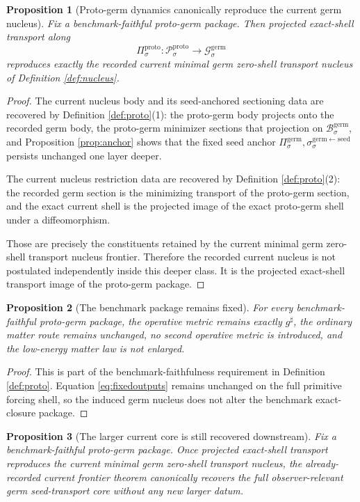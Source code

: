 \documentclass[11pt]{article}
\newcommand{\CompletedMetric}{g^{\sharp}}
\newcommand{\GermState}[1]{\mathcal G_{#1}^{\mathrm{germ}}}
\newcommand{\GermBody}[1]{\mathcal B_{#1}^{\mathrm{germ}}}
\newcommand{\GermProj}[1]{\Pi_{#1}^{\mathrm{germ}}}
\newcommand{\GermSeedSec}[1]{\sigma_{#1}^{\mathrm{germ\leftarrow seed}}}
\newcommand{\ProtoState}[1]{\mathcal P_{#1}^{\mathrm{proto}}}
\newcommand{\ProtoProj}[1]{\Pi_{#1}^{\mathrm{proto}}}
\newtheorem{proposition}{Proposition}
\begin{document}
\begin{proposition}[Proto-germ dynamics canonically reproduce the current germ nucleus]
\label{prop:nucleus}
Fix a benchmark-faithful proto-germ package. Then projected exact-shell transport along
\[
\ProtoProj{\sigma}:\ProtoState{\sigma}\to\GermState{\sigma}
\]
reproduces exactly the recorded current minimal germ zero-shell transport nucleus of Definition \ref{def:nucleus}.
\end{proposition}

\begin{proof}
The current nucleus body and its seed-anchored sectioning data are recovered by Definition \ref{def:proto}(1): the proto-germ body projects onto the recorded germ body, the proto-germ minimizer sections that projection on \(\GermBody{\sigma}\), and Proposition \ref{prop:anchor} shows that the fixed seed anchor \(\GermProj{\sigma},\GermSeedSec{\sigma}\) persists unchanged one layer deeper.

The current nucleus restriction data are recovered by Definition \ref{def:proto}(2): the recorded germ section is the minimizing transport of the proto-germ section, and the exact current shell is the projected image of the exact proto-germ shell under a diffeomorphism.

Those are precisely the constituents retained by the current minimal germ zero-shell transport nucleus frontier. Therefore the recorded current nucleus is not postulated independently inside this deeper class. It is the projected exact-shell transport image of the proto-germ package.
\end{proof}

\begin{proposition}[The benchmark package remains fixed]
\label{prop:boundary}
For every benchmark-faithful proto-germ package, the operative metric remains exactly \(\CompletedMetric\), the ordinary matter route remains unchanged, no second operative metric is introduced, and the low-energy matter law is not enlarged.
\end{proposition}

\begin{proof}
This is part of the benchmark-faithfulness requirement in Definition \ref{def:proto}. Equation \eqref{eq:fixedoutputs} remains unchanged on the full primitive forcing shell, so the induced germ nucleus does not alter the benchmark exact-closure package.
\end{proof}

\begin{proposition}[The larger current core is still recovered downstream]
\label{prop:downstream}
Fix a benchmark-faithful proto-germ package. Once projected exact-shell transport reproduces the current minimal germ zero-shell transport nucleus, the already-recorded current frontier theorem canonically recovers the full observer-relevant germ seed-transport core without any new larger datum.
\end{proposition}
\end{document}

